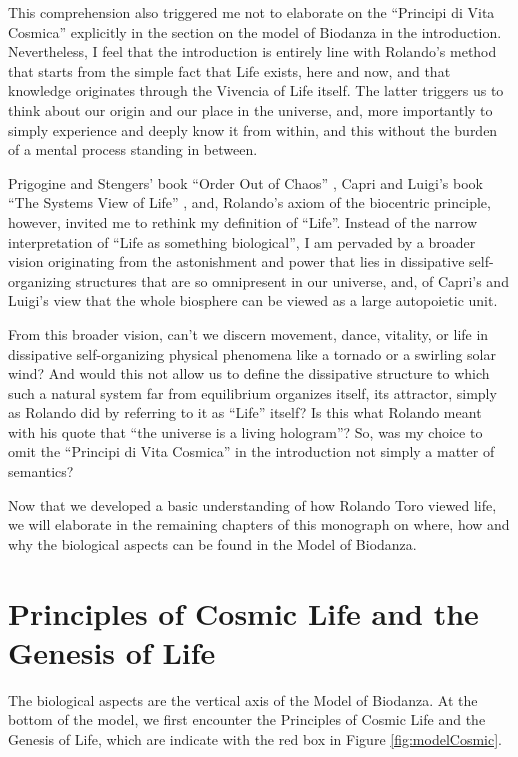 \documentclass[
  11pt,
]{book}
\begin{document}
This comprehension also triggered me not to elaborate on the ``Principi di Vita Cosmica'' explicitly in the section on the model of Biodanza in the introduction. Nevertheless, I feel that the introduction is entirely line with Rolando's method that starts from the simple fact that Life exists, here and now, and that knowledge originates through the Vivencia of Life itself. The latter triggers us to think about our origin and our place in the universe, and, more importantly to simply experience and deeply know it from within, and this without the burden of a mental process standing in between.

Prigogine and Stengers' book ``Order Out of Chaos'' \citep{prigogineStengers1984}, Capri and Luigi's book ``The Systems View of Life'' \citep{capraLuisi2014}, and, Rolando's axiom of the biocentric principle, however, invited me to rethink my definition of ``Life''. Instead of the narrow interpretation of ``Life as something biological'', I am pervaded by a broader vision originating from the astonishment and power that lies in dissipative self-organizing structures that are so omnipresent in our universe, and, of Capri's and Luigi's view that the whole biosphere can be viewed as a large autopoietic unit.

From this broader vision, can't we discern movement, dance, vitality, or life in dissipative self-organizing physical phenomena like a tornado or a swirling solar wind? And would this not allow us to define the dissipative structure to which such a natural system far from equilibrium organizes itself, its attractor, simply as Rolando did by referring to it as ``Life'' itself? Is this what Rolando meant with his quote that ``the universe is a living hologram''? So, was my choice to omit the ``Principi di Vita Cosmica'' in the introduction not simply a matter of semantics?

Now that we developed a basic understanding of how Rolando Toro viewed life, we will elaborate in the remaining chapters of this monograph on where, how and why the biological aspects can be found in the Model of Biodanza.

\hypertarget{principles-of-cosmic-life-and-the-genesis-of-life}{%
\chapter{Principles of Cosmic Life and the Genesis of Life}\label{principles-of-cosmic-life-and-the-genesis-of-life}}

The biological aspects are the vertical axis of the Model of Biodanza.
At the bottom of the model, we first encounter the Principles of Cosmic Life and the Genesis of Life, which are indicate with the red box in Figure \ref{fig:modelCosmic}.
\end{document}
